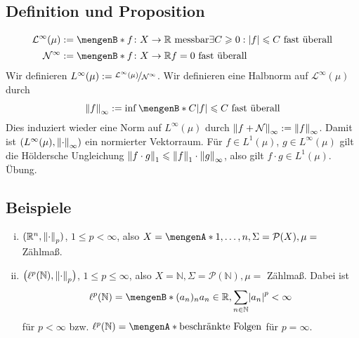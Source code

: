 \subsection[Definition und Proposition: Der normierte Raum $L^\infty(\mu)$ und ]{Definition und Proposition} %
\label{sub:48}
\begin{align*}
	\mathcal{L}^\infty(\mu) &:= \set[f \colon X \to \mathds{R} \text{ messbar}]{\exists C \ge 0 : \abs*{f} \le C \text{ fast überall} \rule{0cm}{0.7em}\rule{0cm}{0.9em}}  \\
	\mathcal{N}^\infty &:= \set[f \colon X \to \mathds{R}]{f=0 \text{ fast überall}\rule{0cm}{0.9em}} 
\end{align*}
Wir definieren $L^\infty(\mu) := \nicefrac{\mathcal{L}^\infty(\mu)}{\mathcal{N}^\infty}$. Wir definieren eine Halbnorm auf $\mathcal{L}^\infty(\mu)$ durch
\[
	\norm[\infty]{f} := \inf \set[C]{\abs*{f} \le C \text{ fast überall}\rule{0cm}{0.9em}}
\]
Dies induziert wieder eine Norm auf $L^\infty(\mu)$ durch $\norm[\infty]{f + \mathcal{N}} := \norm[\infty]{f}$. Damit ist $\enbrace*{L^\infty(\mu), \norm[\infty]{\cdot}}$
ein normierter Vektorraum. Für $f \in L^1(\mu)$, $g \in L^\infty(\mu)$ gilt die Höldersche Ungleichung $\norm[1]{f \cdot g} \le \norm[1]{f} \cdot \norm[\infty]{g}$, also gilt
$f \cdot g \in L^1(\mu)$.
Übung. \bewende

\subsection[Beispiele für $L^p$-Räume]{Beispiele} %
\label{sub:49}
\begin{enumerate}[(i)]
	\item $(\mathds{R}^n, \norm[p]{\cdot})$, $1 \le p < \infty$, also $X=\set{1,\ldots,n}, \Sigma=\mathcal{P}(X), \mu =$ Zählmaß.
	\item $\enbrace[\big]{\ell^p(\mathds{N}), \norm[p]{\cdot }}$, $1 \le p \le \infty$, also $X=\mathds{N}, \Sigma=\mathcal{P}(\mathds{N}), \mu=$ Zählmaß.
	Dabei ist 
	\[
		\ell^p(\mathds{N}) = \set[(a_n)_n]{a_n \in \mathds{R}, \sum_{n \in \mathds{N}} \abs*{a_n}^p < \infty} 
	\]
	für $p < \infty$ bzw. $\ell^p(\mathds{N})= \set{\text{beschränkte Folgen}}$ für $p=\infty$.
\end{enumerate}

